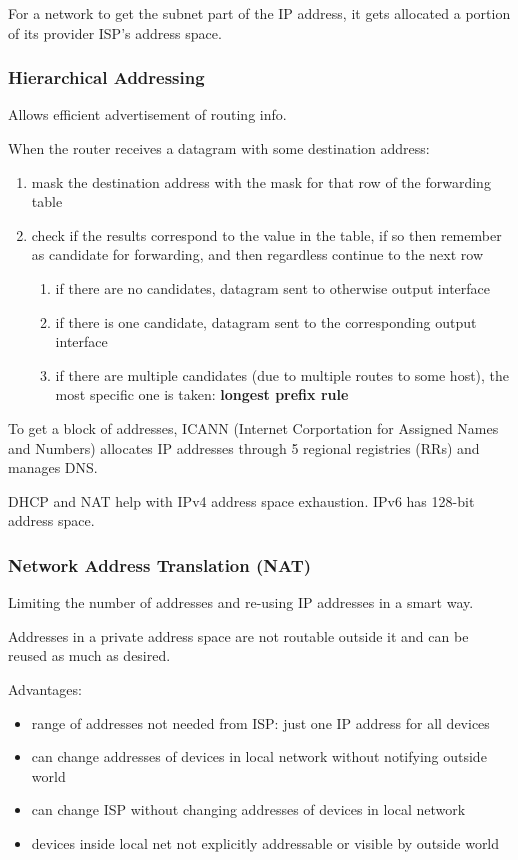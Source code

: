 \documentclass[11pt]{article}
\begin{document}
For a network to get the subnet part of the IP address, it gets
allocated a portion of its provider ISP's address space.
\subsubsection{Hierarchical Addressing}
\label{sec:org5d69820}
Allows efficient advertisement of routing info.

When the router receives a datagram with some destination address:
\begin{enumerate}
\item mask the destination address with the mask for that row of the
forwarding table
\item check if the results correspond to the value in the table, if so
then remember as candidate for forwarding, and then regardless
continue to the next row
\begin{enumerate}
\item if there are no candidates, datagram sent to otherwise
output interface
\item if there is one candidate, datagram sent to the corresponding
output interface
\item if there are multiple candidates (due to multiple routes to some
host), the most specific one is taken: \textbf{longest prefix rule}
\end{enumerate}
\end{enumerate}

To get a block of addresses, ICANN (Internet Corportation for Assigned
Names and Numbers) allocates IP addresses through 5 regional registries (RRs)
and manages DNS.

DHCP and NAT help with IPv4 address space exhaustion.
IPv6 has 128-bit address space.
\subsubsection{Network Address Translation (NAT)}
\label{sec:org51672f8}
Limiting the number of addresses and re-using IP addresses in a smart way.

Addresses in a private address space are not routable outside it and can
be reused as much as desired.

Advantages:
\begin{itemize}
\item range of addresses not needed from ISP: just one IP address for all devices
\item can change addresses of devices in local network without notifying
outside world
\item can change ISP without changing addresses of devices in local network
\item devices inside local net not explicitly addressable or visible by outside
world
\end{itemize}
\end{document}
